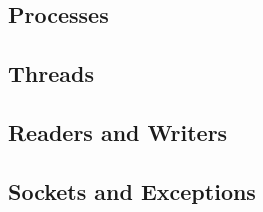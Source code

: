 \documentclass{scrartcl}
\begin{document}
    \subsection{Processes}
    \subsection{Threads}
    \subsection{Readers and Writers}
    \subsection{Sockets and Exceptions}
   
\end{document}
